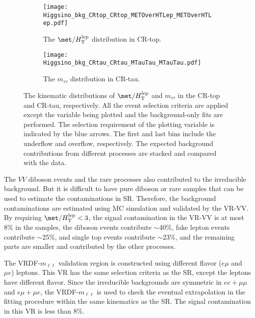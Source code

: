 \begin{figure}[ht]
    \begin{center}
        \begin{subfigure}[b]{0.48\textwidth}
            \texttt{[image: Higgsino\_bkg\_CRtop\_CRtop\_METOverHTLep\_METOverHTLep.pdf]}
            \caption{{\footnotesize The $\met/H_\mathrm{T}^\mathrm{lep}$ distribution in CR-top.}}
            \label{fig:bkg_kinematic_metOverHT_CRtop}
        \end{subfigure}
        \begin{subfigure}[b]{0.48\textwidth}
            \texttt{[image: Higgsino\_bkg\_CRtau\_CRtau\_MTauTau\_MTauTau.pdf]}
            \caption{The $m_{\tau \tau}$ distribution in CR-tau.}
            \label{fig:bkg_kinematic_mtautau_CRtau}
        \end{subfigure}
        \caption{The kinematic distributions of $\met/H_\mathrm{T}^\mathrm{lep}$ and $m_{\tau \tau}$ in the CR-top and CR-tau, respectively.
        All the event selection criteria are applied except the variable being plotted and the background-only fits are performed.
        The selection requirement of the plotting variable is indicated by the blue arrows.
        The first and last bins include the underflow and overflow, respectively.
        The expected background contributions from different processes are stacked and compared with the data.}
        \label{fig:bkg_kinematic_distributions_in_CRs}
    \end{center}
\end{figure}

The $VV$ diboson events and the rare processes also contributed to the irreducible background.
But it is difficult to have pure diboson or rare samples that can be used to estimate the contaminations in SR.
Therefore, the background contaminations are estimated using MC simulation and validated by the VR-VV.
By requiring $\met/H_\mathrm{T}^\mathrm{lep} < 3$, the signal contamination in the VR-VV is at most 8\% in the samples, the diboson events contribute $\sim$40\%, fake lepton events contribute $\sim$25\%, \ttbar and single top events contribute $\sim$23\%, and the remaining parts are smaller and contributed by the other processes.

The VRDF-$m_{\ell \ell}$ validation region is constructed using different flavor ($e\mu$ and $\mu e$) leptons.
This VR has the same selection criteria as the SR, except the leptons have different flavor.
Since the irreducible backgrounds are symmetric in $ee+\mu\mu$ and $e\mu+\mu e$, the VRDF-$m_{\ell \ell}$ is used to check the eventual extrapolation in the fitting procedure within the same kinematics as the SR.
The signal contamination in this VR is less than 8\%.

